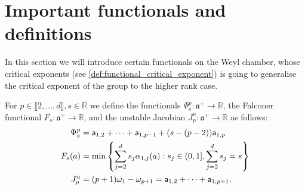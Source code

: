 \documentclass{report}
\begin{document}
\section{Important functionals and definitions}
In this section we will introduce certain functionals on the Weyl chamber, whose critical exponents (see \cref{def:functional_critical_exponent}) is going to generalise the critical exponent of the group to the higher rank case.
\begin{definition}
For $p \in \llbracket 2, \ldots, d \rrbracket, s\in \mathbb R $
we define the functionals $\Psi_s^p: \mathfrak a^+ \to \mathbb R$, the Falconer functional $F_s: \mathfrak a^+ \to \mathbb R$, and the unstable Jacobian $J_p^u: \mathfrak a^+ \to \mathbb R$ as follows:
\begin{align*}
\Psi_s^p &= 
    {\sf a}_{1,2} + \cdots + {\sf a}_{1,p-1} + (s - (p-2)){\sf a}_{1,p}\\
F_s(a) &= \min 
    \left\{
        \sum_{j=2}^d s_j \alpha_{1,j}(a) : s_j \in (0,1], \sum_{j=2}^d s_j = s 
    \right\}\\
J_p^u &= (p+1)\omega_1 - \omega_{p+1} =
{\sf a}_{1,2} + \cdots + {\sf a}_{1,p+1}.
\end{align*}
\end{definition}
\end{document}
